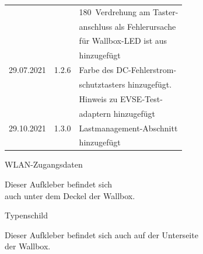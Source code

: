 \documentclass[a4paper,10pt]{article}
\begin{document}
\begin{multicols*}{2}
\begin{tabular}{lll}
		           &         & 180\textdegree\ Verdrehung am Taster-\\
		           &         & anschluss als Fehlerursache \\
		           &         & für \glqq Wallbox-LED ist aus\grqq\\
		           &         & hinzugefügt                 \\
		29.07.2021 & 1.2.6   & Farbe des DC-Fehlerstrom-   \\
		           &         & schutztasters hinzugefügt.  \\
		           &         & Hinweis zu EVSE-Test-\\
		           &         & adaptern hinzugefügt\\
		29.10.2021 & 1.3.0   & Lastmanagement-Abschnitt \\
		           &         & hinzugefügt\\
		\bottomrule
	\end{tabular}
	\newpage
	\pagestyle{empty}
	\null
	\vfill
	WLAN-Zugangsdaten
	\begin{tcolorbox}[width=4.2cm,height=2.7cm, boxrule=0.25mm]

	\end{tcolorbox}
	Dieser Aufkleber befindet sich\\ auch unter dem Deckel der Wallbox.
	\columnbreak

	\null
	\vfill
	Typenschild
	\begin{tcolorbox}[width=7.8cm,height=4.1cm, boxrule=0.25mm]

	\end{tcolorbox}
	Dieser Aufkleber befindet sich auch auf der Unterseite\\ der Wallbox.
\end{multicols*}
\end{document}
